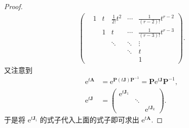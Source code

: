 \documentclass[../../main.tex]{subfiles}%
\begin{document}
\begin{proof}
\begin{align*}
\begin{pmatrix}
 & 1 & t & \frac{1}{2!}t^2 & \cdots & \frac{1}{(r - 2)!}t^{r - 2} \\
 & & 1 & t & \cdots & \frac{1}{(r - 3)!}t^{r - 3} \\
 & & & \ddots & \ddots & \vdots \\
 & & & & \ddots & t \\
 & & & & & 1
\end{pmatrix}.
\end{align*}
又注意到
\begin{align*}
\mathrm{e}^{t\boldsymbol{A}}&=\mathrm{e}^{\boldsymbol{P}(t\boldsymbol{J})\boldsymbol{P}^{-1}}=\boldsymbol{P}\mathrm{e}^{t\boldsymbol{J}}\boldsymbol{P}^{-1},\\
\mathrm{e}^{t\boldsymbol{J}}&=\begin{pmatrix}
\mathrm{e}^{t\boldsymbol{J}_1} & & \\
 & \ddots & \\
 & & \mathrm{e}^{t\boldsymbol{J}_k}
\end{pmatrix}.
\end{align*}
于是将 $\mathrm{e}^{t\boldsymbol{J}_i}$ 的式子代入上面的式子即可求出 $\mathrm{e}^{t\boldsymbol{A}}$. 
\end{proof}
\end{document}
